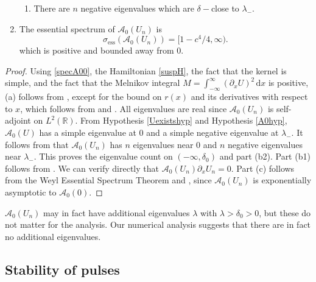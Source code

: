 \documentclass[review,onefignum,onetabnum]{siamart171218}
\newcommand{\R}{\mathbb{R}}
\newcommand{\rmd}{\mathrm{d}}
\newcommand{\calA}{\mathcal{A}}
\begin{document}
\begin{theorem}
\begin{enumerate}
\begin{enumerate}
    \item There are $n$ negative eigenvalues which are $\delta-$close to $\lambda_-$.
  \end{enumerate}

  \item The essential spectrum of $\calA_0(U_n)$ is
    \begin{equation}\label{A0ess}
    \sigma_{\text{ess}}(\calA_0(U_n)) = [1 - c^4/4, \infty).
    \end{equation}
    which is positive and bounded away from 0.

\end{enumerate}
\end{theorem}

\begin{proof}
Using \cref{specA00}, the Hamiltonian \cref{suspH}, the fact that the kernel is simple, and the fact that the Melnikov integral $M = \int_{-\infty}^\infty (\partial_x U)^2\,\rmd x$ is positive, (a) follows from \cite[Theorem~3.6]{sandstede:iol97}, except for the bound on $r(x)$ and its derivatives with respect to $x$, which follows from \cite{Sanstede1993} and \cite{sandstede:som98}. All eigenvalues are real since $\calA_0(U_n)$ is self-adjoint on $L^2(\R)$.  From Hypothesis \ref{Uexistshyp} and Hypothesis \ref{A0hyp}, $\calA_0(U)$ has a simple eigenvalue at 0 and a simple negative eigenvalue at $\lambda_-$. It follows from \cite{alexander:ati90} that $\calA_0(U_n)$ has $n$ eigenvalues near 0 and $n$ negative eigenvalues near $\lambda_-$. This proves the eigenvalue count on $(-\infty, \delta_0)$ and part (b2). Part (b1) follows from \cite{sandstede:som98}. We can verify directly that $\calA_0(U_n)\partial_x U_n = 0$. Part (c) follows from the Weyl Essential Spectrum Theorem \cite[Theorem~2.2.6]{kapitula:sad13} and \cite[Theorem~3.1.11]{kapitula:sad13}, since $\calA_0(U_n)$ is exponentially asymptotic to $\calA_0(0)$.
\end{proof}

\begin{remark}$\calA_0(U_n)$ may in fact have additional eigenvalues $\lambda$ with $\lambda > \delta_0 > 0$, but these do not matter for the analysis. Our numerical analysis suggests that there are in fact no additional eigenvalues.
\end{remark}

\subsection{Stability of pulses}
\end{document}
